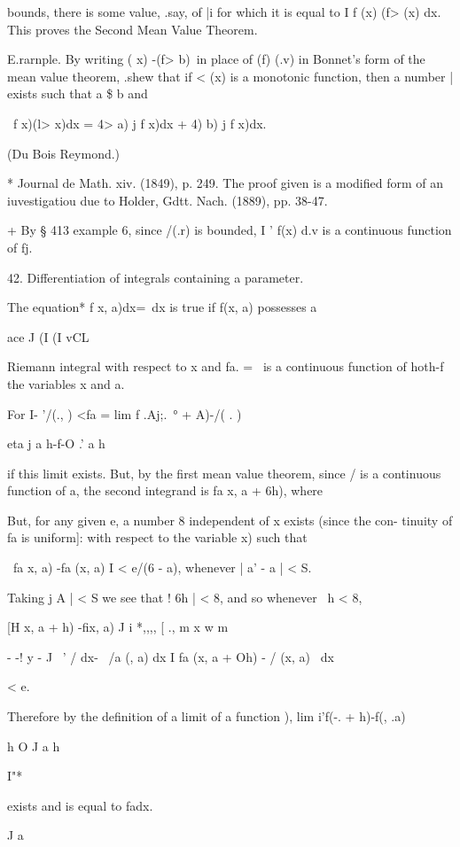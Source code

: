 bounds, there is some value, .say, of |i for which it is equal to I f
(x) (f> (x) dx. This proves the Second Mean Value Theorem.

E.rarnple. By writing ( x) -(f> b)\ in place of (f) (.v) in Bonnet's
form of the mean value theorem, .shew that if < (x) is a monotonic
function, then a number | exists such that a \$ b and

\ f x)(l> x)dx = 4> a) j f x)dx + 4) b) j f x)dx.

(Du Bois Reymond.)

* Journal de Math. xiv. (1849), p. 249. The proof given is a modified
form of an iuvestigatiou due to Holder, Gdtt. Nach. (1889), pp. 38-47.

+ By § 413 example 6, since /(.r) is bounded, I ' f(x) d.v is a
continuous function of fj.

%
%

42. Differentiation of integrals containing a parameter.

The equation* f x, a)dx=\ dx is true if f(x, a) possesses a

ace J (I (I vCL

Riemann integral with respect to x and fa. = \ is a continuous
function of hoth-f the variables x and a.

For I- '/(., ) <fa = lim f .Aj;.\ ° + A)-/( . )

eta j a h-f-O .' a h

if this limit exists. But, by the first mean value theorem, since / is
a continuous function of a, the second integrand is fa x, a + 6h),
where

But, for any given e, a number 8 independent of x exists (since the
con- tinuity of fa is uniform]: with respect to the variable x) such
that

\ fa x, a) -fa (x, a) I < e/(6 - a), whenever | a' - a | < S.

Taking j A | < S we see that ! 6h | < 8, and so whenever \ h < 8,

[H x, a + h) -fix, a) J i *,,,, [ ., m x w m

 - -! y - J \ ' / dx- \ /a (, a) dx I fa (x, a + Oh) - / (x, a) \ dx

< e.

Therefore by the definition of a limit of a function ), lim
i'f(-. + h)-f(, .a)

h O J a h

I"*

exists and is equal to fadx.

J a

